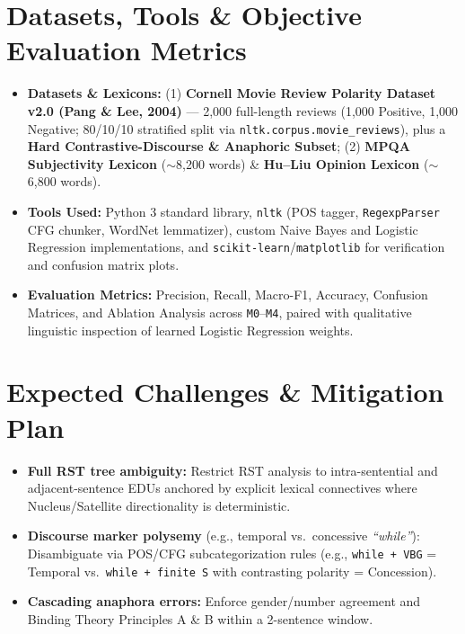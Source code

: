 \documentclass[11pt,a4paper]{article}
\begin{document}
\section{Datasets, Tools \& Objective Evaluation Metrics}
\begin{itemize}
    \item \textbf{Datasets \& Lexicons:} (1) \textbf{Cornell Movie Review Polarity Dataset v2.0 (Pang \& Lee, 2004)} --- 2,000 full-length reviews (1,000 Positive, 1,000 Negative; 80/10/10 stratified split via \texttt{nltk.corpus.movie\_reviews}), plus a \textbf{Hard Contrastive-Discourse \& Anaphoric Subset}; (2) \textbf{MPQA Subjectivity Lexicon} ($\sim$8,200 words) \& \textbf{Hu--Liu Opinion Lexicon} ($\sim$6,800 words).
    \item \textbf{Tools Used:} Python 3 standard library, \texttt{nltk} (POS tagger, \texttt{RegexpParser} CFG chunker, WordNet lemmatizer), custom Naive Bayes and Logistic Regression implementations, and \texttt{scikit-learn}/\texttt{matplotlib} for verification and confusion matrix plots.
    \item \textbf{Evaluation Metrics:} Precision, Recall, Macro-F1, Accuracy, Confusion Matrices, and Ablation Analysis across \texttt{M0}--\texttt{M4}, paired with qualitative linguistic inspection of learned Logistic Regression weights.
\end{itemize}

\section{Expected Challenges \& Mitigation Plan}
\begin{itemize}
    \item \textbf{Full RST tree ambiguity:} Restrict RST analysis to intra-sentential and adjacent-sentence EDUs anchored by explicit lexical connectives where Nucleus/Satellite directionality is deterministic.
    \item \textbf{Discourse marker polysemy} (e.g., temporal vs.\ concessive \textit{``while''}): Disambiguate via POS/CFG subcategorization rules (e.g., \texttt{while + VBG} = Temporal vs.\ \texttt{while + finite S} with contrasting polarity = Concession).
    \item \textbf{Cascading anaphora errors:} Enforce gender/number agreement and Binding Theory Principles A \& B within a 2-sentence window.
\end{itemize}
\end{document}
